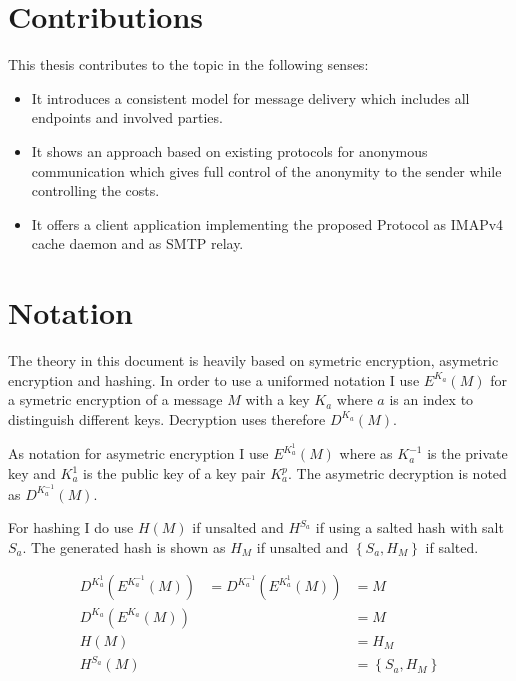 \section{Contributions}
This thesis contributes to the topic in the following senses:
\begin{itemize}
\item It introduces a consistent model for message delivery which includes all endpoints and involved parties.
\item It shows an approach based on existing protocols for anonymous communication which gives full control of the anonymity to the sender while controlling the costs.
\item It offers a client application implementing the proposed Protocol as IMAPv4 cache daemon and as SMTP relay.
\end{itemize}

\section{Notation}
The theory in this document is heavily based on symetric encryption, asymetric encryption and hashing. In order to use a uniformed notation I use $E^{K_a}(M)$ for a symetric encryption of a message $M$ with a key $K_a$ where $a$ is an index to distinguish different keys. Decryption uses therefore $D^{K_a}(M)$.\par
As notation for asymetric encryption I use $E^{K^{1}_a}(M)$ where as $K^{-1}_a$ is the private key and $K^{1}_a$ is the public key of a key pair $K^p_a$. The asymetric decryption is noted as $D^{K^{-1}_a}(M)$.\par
For hashing I do use $H(M)$ if unsalted and $H^{S_a}$ if using a salted hash with salt $S_a$. The generated hash is shown as $H_M$ if unsalted and $\left\lbrace S_a,H_M\right\rbrace$ if salted.\par

\begin{eqnarray}
D^{K^{1}_a}\left(E^{K^{-1}_a}\left(M\right)\right)&=D^{K^{-1}_a}\left(E^{K^{1}_a}\left(M\right)\right)&=M\\
D^{K_a}\left(E^{K_a}\left(M\right)\right)&~&=M\\
H\left(M\right)&~&=H_M\\
H^{S_a}\left(M\right)&~&=\left\lbrace S_a,H_M\right\rbrace
\end{eqnarray}
